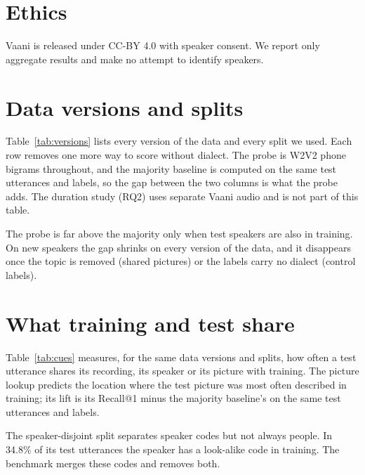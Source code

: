 \documentclass[11pt]{article}
\begin{document}
\section*{Ethics}
Vaani is released under CC-BY 4.0 with speaker consent. We report only aggregate results and make no attempt to
identify speakers.



\appendix
\section{Data versions and splits}
\label{app:versions}
Table~\ref{tab:versions} lists every version of the data and every split we used. Each row removes one more way
to score without dialect. The probe is W2V2 phone bigrams throughout, and the majority baseline is computed on the
same test utterances and labels, so the gap between the two columns is what the probe adds. The duration study
(RQ2) uses separate Vaani audio and is not part of this table.

The probe is far above the majority only when test speakers are also in training. On new speakers the gap shrinks
on every version of the data, and it disappears once the topic is removed (shared pictures) or the labels carry no
dialect (control labels).

\begin{table}[t]
\centering\footnotesize

\caption{Every data version and split, from PRiSM's release to the planned benchmark. Recall@1 on the test set;
probe values are mean $\pm$ sd over seeds. With control labels, both columns score the reassigned locations.}
\label{tab:versions}
\end{table}

\section{What training and test share}
\label{app:cues}
Table~\ref{tab:cues} measures, for the same data versions and splits, how often a test utterance shares its
recording, its speaker or its picture with training. The picture lookup predicts the location where
the test picture was most often described in training; its lift is its Recall@1 minus the majority baseline's on
the same test utterances and labels.

The speaker-disjoint split separates speaker codes but not always people. In 34.8\% of its test utterances the
speaker has a look-alike code in training. The benchmark merges these codes and removes both.
\end{document}

